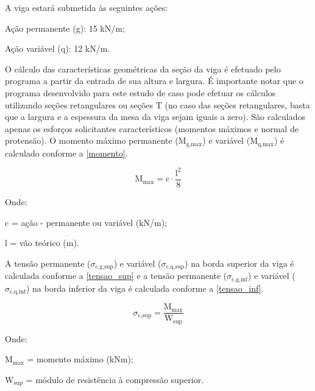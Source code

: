 A viga estará submetida às seguintes ações:

\begin{alineas}
	\item Ação permanente (g): 15 kN/m;
	\item Ação variável (q): 12 kN/m.
\end{alineas}

O cálculo das características geométricas da seção da viga é efetuado pelo programa a partir da entrada de sua altura e largura. É importante notar que o programa desenvolvido para este estudo de caso pode efetuar os cálculos utilizando seções retangulares ou seções T (no caso das seções retangulares, basta que a largura e a espessura da mesa da viga sejam iguais a zero). São calculados apenas os esforços solicitantes característicos (momentos máximos e normal de protensão). O momento máximo permanente ($ \text{M}_{\text{g},\text{max}} $) e variável ($ \text{M}_{\text{q},\text{max}} $) é calculado conforme a \autoref{momento}.

\begin{equation}
	\label{momento}
	\text{M}_{\text{max}} = \text{c} \cdot \frac{\text{l}^2}{8}
\end{equation}

Onde:

\begin{alineas}[label=\textbullet]
	\item c = ação - permanente ou variável (kN/m);
	\item l = vão teórico (m).
\end{alineas}

A tensão permanente ($ \sigma_{\text{c,g,sup}} $) e variável ($ \sigma_{\text{c,q,sup}} $)  na borda superior da viga é calculada conforme a \autoref{tensao_sup} e a tensão permanente ($ \sigma_{\text{c,g,inf}} $) e variável ($ \sigma_{\text{c,q,inf}} $) na borda inferior da viga é calculada conforme a \autoref{tensao_inf}.

\begin{equation}
	\label{tensao_sup}
	\sigma_{\text{c,sup}} = \frac{\text{M}_\text{max}}{\text{W}_\text{sup}}
\end{equation}

Onde:

\begin{alineas}[label=\textbullet]
	\item $ \text{M}_\text{max} $ = momento máximo (kNm);
	\item $ \text{W}_\text{sup} $ = módulo de resistência à compressão superior.
\end{alineas}

